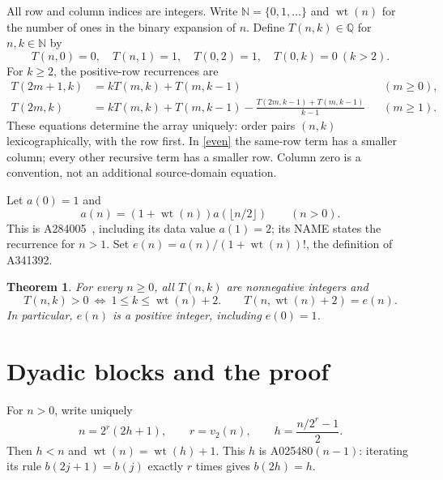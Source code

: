 \documentclass[11pt]{article}
\newcommand{\wt}{\operatorname{wt}}
\newtheorem{theorem}{Theorem}
\begin{document}
All row and column indices are integers. Write $\mathbb N=\{0,1,\ldots\}$
and $\wt(n)$ for the number of ones in the binary expansion of $n$.
Define $T(n,k)\in\mathbb Q$ for $n,k\in\mathbb N$ by
\begin{equation}\label{initial}
 T(n,0)=0,\quad T(n,1)=1,\quad T(0,2)=1,\quad T(0,k)=0\ (k>2).
\end{equation}
For $k\geq2$, the positive-row recurrences are
\begin{align}
 T(2m+1,k)&=kT(m,k)+T(m,k-1) &&(m\geq0),\label{odd}\\
 T(2m,k)&=kT(m,k)+T(m,k-1)
 -\frac{T(2m,k-1)+T(m,k-1)}{k-1}
 &&(m\geq1).\label{even}
\end{align}
These equations determine the array uniquely: order pairs $(n,k)$
lexicographically, with the row first. In \eqref{even} the same-row term
has a smaller column; every other recursive term has a smaller row.
Column zero is a convention, not an additional source-domain equation.

Let $a(0)=1$ and
\begin{equation}\label{productrec}
 a(n)=(1+\wt(n))a(\lfloor n/2\rfloor)\qquad(n>0).
\end{equation}
This is A284005~\cite{product}, including its data value $a(1)=2$;
its NAME states the recurrence for $n>1$.
Set $e(n)=a(n)/(1+\wt(n))!$, the definition of A341392.

\begin{theorem}\label{main}
For every $n\geq0$, all $T(n,k)$ are nonnegative integers and
\[
 T(n,k)>0\ \Longleftrightarrow\ 1\leq k\leq\wt(n)+2.
 \qquad
 T(n,\wt(n)+2)=e(n).
\]
In particular, $e(n)$ is a positive integer, including $e(0)=1$.
\end{theorem}

\section{Dyadic blocks and the proof}
For $n>0$, write uniquely
\begin{equation}\label{parent}
 n=2^r(2h+1),\qquad r=v_2(n),\qquad
 h=\frac{n/2^r-1}{2}.
\end{equation}
Then $h<n$ and $\wt(n)=\wt(h)+1$. This $h$ is A025480$(n-1)$:
iterating its rule $b(2j+1)=b(j)$ exactly $r$ times gives $b(2h)=h$.
\end{document}
